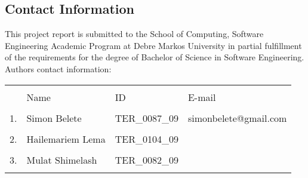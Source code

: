
\begin{normalsize}

\begin{center}
\section*{Contact Information}
\end{center}


\doublespacing
\vspace{1.0cm}
\noindent
This project report is submitted to the School of Computing, Software Engineering Academic Program at Debre Markos University in partial fulfillment of the requirements for the degree of Bachelor of Science in Software Engineering. Authors contact information:

\begin{tabular}{p{.2in}p{1.4in}p{1.7in}p{1.5in} }
\\
\\
 & Name &  ID & E-mail \\
 \\
 1. & Simon Belete & TER\_0087\_09 & simonbelete@gmail.com \\
 \\
 2. & Hailemariem Lema & TER\_0104\_09 & \hrulefill \\
 \\
 3. & Mulat Shimelash & TER\_0082\_09 & \hrulefill \\
 \\	
\end{tabular}

\end{normalsize}